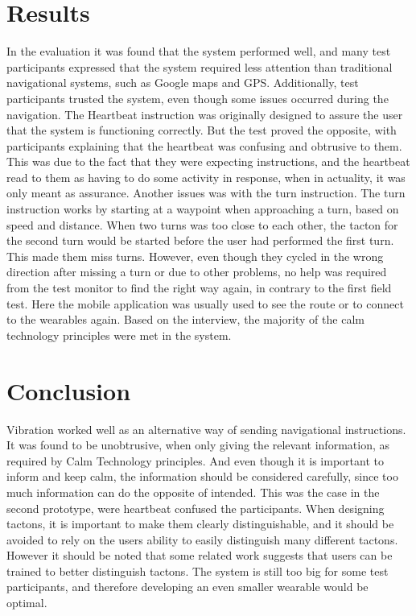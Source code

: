 \documentclass{sigchi}
\begin{document}
\section{Results}
In the evaluation it was found that the system performed well, and many test participants expressed that the system required less attention than traditional navigational systems, such as Google maps and GPS. 
\newline
\newline
Additionally, test participants trusted the system, even though some issues occurred during the navigation. The Heartbeat instruction was originally designed to assure the user that the system is functioning correctly. But the test proved the opposite, with participants explaining that the heartbeat was confusing and obtrusive to them. This was due to the fact that they were expecting instructions, and the heartbeat read to them as having to do some activity in response, when in actuality, it was only meant as assurance.
\newline
Another issues was with the turn instruction. The turn instruction works by starting at a waypoint when approaching a turn, based on speed and distance. When two turns was too close to each other, the tacton for the second turn would be started before the user had performed the first turn. This made them miss turns.
\newline
\newline 
However, even though they cycled in the wrong direction after missing a turn or due to other problems, no help was required from the test monitor to find the right way again, in contrary to the first field test.  Here the mobile application was usually used to see the route or to connect to the wearables again. 
\newline
Based on the interview, the majority of the calm technology principles were met in the system. 
\section{Conclusion}
Vibration worked well as an alternative way of sending navigational instructions. It was found to be unobtrusive, when only giving the relevant information, as required by Calm Technology principles. 
And even though it is important to inform and keep calm, the information should be considered carefully, since too much information can do the opposite of intended. This was the case in the second prototype, were heartbeat confused the participants. When designing tactons, it is important to make them clearly distinguishable, and it should be avoided to rely on the users ability to easily distinguish many different tactons. However it should be noted that some related work suggests that users can be trained to better distinguish tactons. 
\newline
The system is still too big for some test participants, and therefore developing an even smaller wearable would be optimal. 
\end{document}
